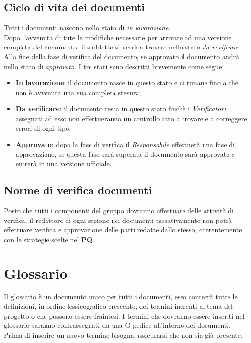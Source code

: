 \documentclass{scalatekids-article}
\begin{document}
\subsection{Ciclo di vita dei documenti}
Tutti i documenti nascono nello stato di \textit{in lavorazione}.\\
Dopo l'avvenuta di tute le modifiche necessarie per arrivare ad una versione completa del documento, il suddetto si verrà a trovare nello stato \textit{da verificare}.\\
Alla fine della fase di verifica del documento, se approvato il documento andrà nello stato di \textit{approvato}.
I tre stati sono descritti brevemente come segue:
\begin{itemize}
\item \textbf{In lavorazione}: il documento nasce in questo stato e ci rimane fino a che non è avvenuta una sua completa stesura;
\item \textbf{Da verificare}: il documento resta in questo stato finchè i \textit{Verificatori} assegnati ad esso non effettueranno un controllo atto a trovare e a correggere errori di ogni tipo;
\item \textbf{Approvato}: dopo la fase di verifica il \textit{Responsabile} effettuerà una fase di approvazione, se questa fase sarà superata il documento sarà approvato e entrerà in una versione ufficiale.
\end{itemize}

\subsection{Norme di verifica documenti}
Posto che tutti i componenti del gruppo dovranno affettuare delle attività di
verifica, il redattore di ogni sezione nei documenti tassativamente non potrà
effettuare verifica e approvazione delle parti redatte dallo stesso,
coerentemente con le strategie scelte nel \textbf{PQ}.

\section{Glossario}
Il glossario è un documento unico per tutti i documenti, esso conterrà tutte le
definizioni, in ordine lessicografico crescente, dei termini inerenti al tema
del progetto o che possono essere fraintesi. I termini che dovranno essere
inseriti nel glossario saranno contrassegnati da una G pedice all'interno dei
documenti. Prima di inserire un nuovo termine bisogna assicurarsi che non sia
già presente.
\end{document}
